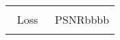\begin{tabular}{c c c c c c c c c}
\\ \\



\multicolumn{4}{c}{Loss}  &  \multicolumn{5}{c}{PSNR{\color{white}bbbb}}

\\

\multicolumn{4}{c}{}
&
\multicolumn{5}{c}{}
\end{tabular}